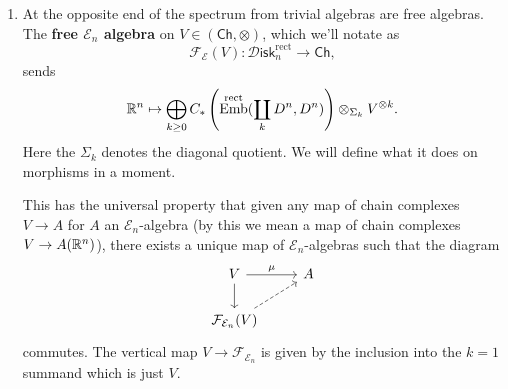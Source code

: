 \documentclass{amsart}
\DeclareMathOperator{\Emb}{Emb}
\newcommand{\Diskr}{\mathscr{D}\mathsf{isk}_n^\text{rect}}
\begin{document}
\begin{enumerate}
    \item At the opposite end of the spectrum from trivial algebras are free algebras.
        The \textbf{free $\mathcal{E}_n$ algebra} on $V\in (\mathsf{Ch},\otimes)$,
        which we'll notate as
        \begin{equation*}
            \mathcal{F}_{\mathcal{E}}(V):\Diskr\to\mathsf{Ch},
        \end{equation*}
        sends
        \begin{equation*}
            \R^n \mapsto \bigoplus_{k\geq 0}C_*\left( \Emb^\text{rect}(\coprod_kD^n,D^n) \right)\otimes_{\Sigma_k}V^{\otimes k}.
        \end{equation*}
        Here the $\Sigma_k$ denotes the diagonal quotient. We will define what it does
        on morphisms in a moment.

        This has the universal property that given any map of chain complexes $V\to A$
        for $A$ an $\mathcal{E}_n$-algebra (by this we mean a map of chain complexes
        $V\to A(\mathbb{R}^n)$), there exists a unique map of $\mathcal{E}_n$-algebras such that the diagram
        \begin{equation*}
            \begin{tikzcd}
                V \rar{\mu}\dar & A \\
                \mathcal{F}_{\mathcal{E}_n}(V) \ar[ur,dashed]
            \end{tikzcd}
        \end{equation*}
        commutes. The vertical map $V\to \mathcal{F}_{\mathcal{E}_n}$ is given by the
        inclusion into the $k=1$ summand which is just $V$.
        

\end{enumerate}
\end{document}
